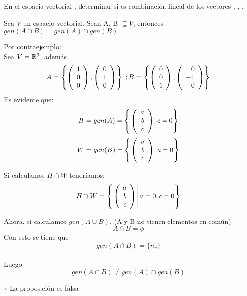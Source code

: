 \begin{enumerate}
\begin{prob}[]
En el espacio vectorial \mdosxdos, determinar si 
 es combinación lineal de los vectores 
, , .
\end{prob}

\newpage

\begin{prop}
Sea $V$ un espacio vectorial. Sean A, B $\subseteq V$, entonces $gen(A\cap B)=gen(A)\cap gen(B)$
\end{prop}
\sol
Por contraejemplo:
~\\
Sea $V=\mathbb{R}^3$, además~\\
\[A=\left\lbrace \left( \begin{array}{r} 1\\ 0\\ 0 \end{array} \right) , \left( \begin{array}{r} 0\\ 1\\ 0 \end{array} \right)  \right\rbrace\  ;  B=\left\lbrace \left( \begin{array}{r} 0\\ 0\\ 1 \end{array} \right) , \left( \begin{array}{r} 0\\ -1\\ 0 \end{array} \right)  \right\rbrace\]
Es evidente que:~\\
\[H=gen(A)=\left\{ \left. \left( \begin{array}{r} a\\ b\\ c \end{array} \right) \right| c=0 \right\}\]
\[W=gen(B)=\left\{ \left. \left( \begin{array}{r} a\\ b\\ c \end{array} \right) \right| a=0 \right\}\]


Si calculamos $H\cap W$ tendríamos:
~\\
\[H\cap W=\left\{ \left. \left( \begin{array}{r} a\\ b\\ c \end{array} \right) \right| a=0, c=0 \right\}\]

Ahora, si calculamos $gen(A \cup B)$, (A y B no tienen elementos en común)~\\
\[A\cap B=\phi \]
Con esto se tiene que
\[gen(A\cap B)=\lbrace n_v \rbrace\]~\\
Luego
\[gen(A\cap B)\neq gen(A)\cap gen(B)\]

$\therefore$ La proposición es falsa
\newpage






\newpage

%

\newpage



\newpage


\end{enumerate}
